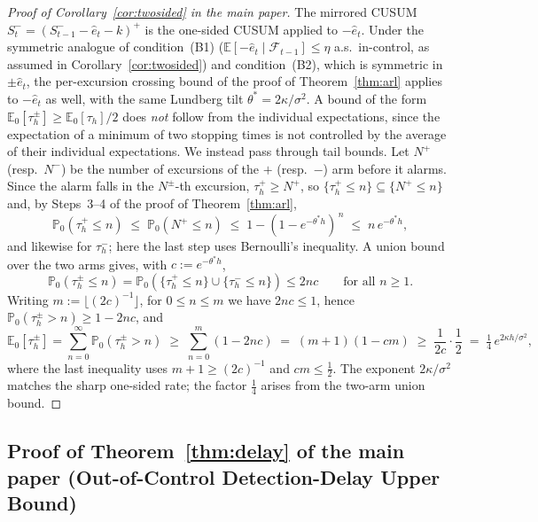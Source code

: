 \documentclass[bj,authoryear]{imsart}
\theoremstyle{plain}
\theoremstyle{definition}
\newcommand{\E}{\mathbb{E}}
\newcommand{\Prob}{\mathbb{P}}
\newcommand{\F}{\mathcal{F}}
\newcommand{\given}{\mid}
\begin{document}
\begin{proof}[Proof of Corollary~\ref{cor:twosided} in the main paper]
  The mirrored CUSUM $S_t^- = (S_{t-1}^- - \hat e_t - k)^+$ is the one-sided
  CUSUM applied to $-\hat e_t$.  Under the symmetric analogue of
  condition~(B1) ($\E[-\hat e_t\given\F_{t-1}]\leq\eta$ a.s.\ in-control,
  as assumed in Corollary~\ref{cor:twosided})
  and condition~(B2), which is symmetric in $\pm\hat e_t$, the
  per-excursion crossing bound of the proof of Theorem~\ref{thm:arl}
  applies to $-\hat e_t$ as well, with the same Lundberg tilt
  $\theta^\ast=2\kappa/\sigma^2$.
  A bound of the form $\E_0[\tau_h^{\pm}]\geq\E_0[\tau_h]/2$ does \emph{not}
  follow from the individual expectations, since the expectation of a minimum
  of two stopping times is not controlled by the average of their individual
  expectations.  We instead pass through tail bounds.
  Let $N^+$ (resp.\ $N^-$) be the number of excursions of the $+$ (resp.\
  $-$) arm before it alarms.  Since the alarm falls in the $N^\pm$-th
  excursion, $\tau_h^+\geq N^+$, so $\{\tau_h^+\leq n\}\subseteq\{N^+\leq n\}$
  and, by Steps~3--4 of the proof of Theorem~\ref{thm:arl},
  \[
    \Prob_0(\tau_h^+\leq n)\;\leq\;\Prob_0(N^+\leq n)
      \;\leq\;1-(1-e^{-\theta^\ast h})^{\,n}\;\leq\;n\,e^{-\theta^\ast h},
  \]
  and likewise for $\tau_h^-$; here the last step uses Bernoulli's
  inequality.  A union bound over the two arms gives, with
  $c:=e^{-\theta^\ast h}$,
  \[
    \Prob_0(\tau_h^{\pm}\leq n)
    =\Prob_0(\{\tau_h^+\leq n\}\cup\{\tau_h^-\leq n\})
    \leq 2nc\qquad\text{for all }n\geq1.
  \]
  Writing $m:=\lfloor(2c)^{-1}\rfloor$, for $0\leq n\leq m$ we have
  $2nc\leq1$, hence $\Prob_0(\tau_h^{\pm}>n)\geq1-2nc$, and
  \[
    \E_0[\tau_h^{\pm}]=\sum_{n=0}^{\infty}\Prob_0(\tau_h^{\pm}>n)
      \;\geq\;\sum_{n=0}^{m}(1-2nc)
      \;=\;(m+1)(1-cm)
      \;\geq\;\frac{1}{2c}\cdot\frac12
      \;=\;\tfrac14\,e^{2\kappa h/\sigma^2},
  \]
  where the last inequality uses $m+1\geq(2c)^{-1}$ and $cm\leq\tfrac12$.
  The exponent $2\kappa/\sigma^2$ matches the sharp one-sided rate; the
  factor $\tfrac14$ arises from the two-arm union bound.
\end{proof}

\subsection{Proof of Theorem~\ref{thm:delay} of the main paper (Out-of-Control Detection-Delay Upper Bound)}
\label{app:proof-delay}
\end{document}
